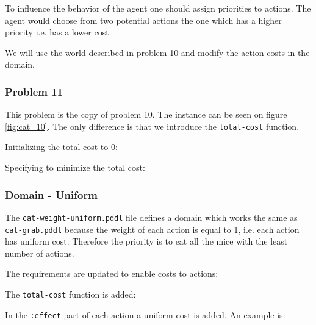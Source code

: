 To influence the behavior of the agent one should assign priorities to actions. The agent would choose from two potential actions the one which has a higher priority i.e. has a lower cost.

We will use the world described in problem 10 and modify the action costs in the domain.

\subsubsection{Problem 11}

This problem is the copy of problem 10. The instance can be seen on figure \ref{fig:cat_10}. The only difference is that we introduce the \verb|total-cost| function.

Initializing the total cost to 0:

 

Specifying to minimize the total cost:

 


\subsubsection{Domain - Uniform}

The \verb|cat-weight-uniform.pddl| file defines a domain which works the same as \verb|cat-grab.pddl| because the weight of each action is equal to 1, i.e. each action has uniform cost. Therefore the priority is to eat all the mice with the least number of actions.

The requirements are updated to enable costs to actions:

 

The \verb|total-cost| function is added:

 

In the \verb|:effect| part of each action a uniform cost is added. An example is:

 


